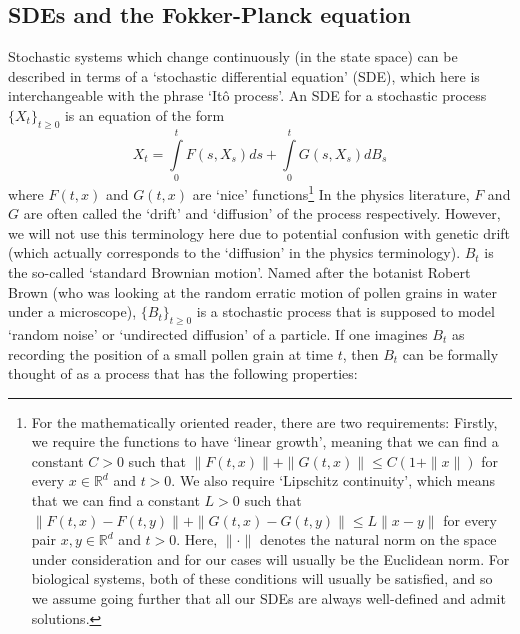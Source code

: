 \subsection{SDEs and the Fokker-Planck equation}\label{intro_SDE}
Stochastic systems which change continuously (in the state space) can be described in terms of a `stochastic differential equation' (SDE), which here is interchangeable with the phrase `It\^o process'. An SDE for a stochastic process $\{X_t\}_{t \geq 0}$ is an equation of the form
\begin{equation}
\label{ito_SDE_integral}
X_t = \int\limits_{0}^{t} F(s,X_s)ds + \int\limits_{0}^{t} G(s,X_s)dB_s
\end{equation}
where $F(t,x)$ and $G(t,x)$ are `nice' functions\footnote{For the mathematically oriented reader, there are two requirements: Firstly, we require the functions to have `linear growth', meaning that we can find a constant $C > 0$ such that $\|F(t,x)\| + \|G(t,x)\| \leq C(1+\|x\|)$ for every $x \in \mathbb{R}^{d}$ and $t > 0$. We also require `Lipschitz continuity', which means that we can find a constant $L > 0$ such that $\|F(t,x) - F(t,y)\| + \|G(t,x)-G(t,y)\| \leq L\|x-y\|$ for every pair $x,y \in \mathbb{R}^d$ and $t > 0$. Here, $\|\cdot\|$ denotes the natural norm on the space under consideration and for our cases will usually be the Euclidean norm. For biological systems, both of these conditions will usually be satisfied, and so we assume going further that all our SDEs are always well-defined and admit solutions.} In the physics literature, $F$ and $G$ are often called the `drift' and `diffusion' of the process respectively. However, we will not use this terminology here due to  potential confusion with genetic drift (which actually corresponds to the `diffusion' in the physics terminology). $B_t$ is the so-called `standard Brownian motion'. Named after the botanist Robert Brown (who was looking at the random erratic motion of pollen grains in water under a microscope), $\{B_t\}_{t \geq 0}$ is a stochastic process that is supposed to model `random noise' or `undirected diffusion' of a particle. If one imagines $B_t$ as recording the position of a small pollen grain at time $t$, then $B_t$ can be formally thought of as a process that has the following properties:
